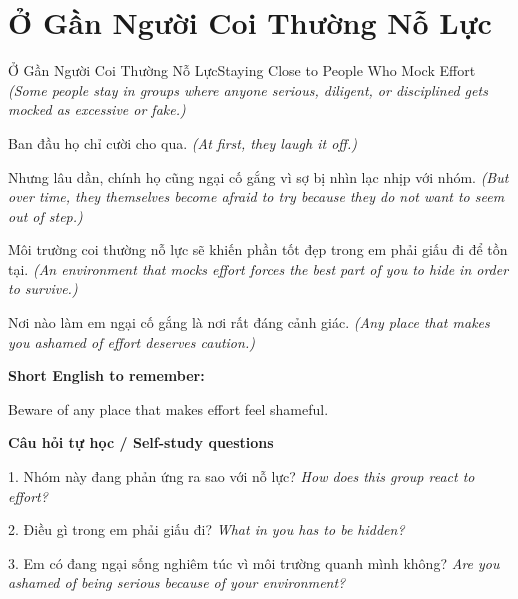 \section{Ở Gần Người Coi Thường Nỗ Lực}
\begin{truyen}{Ở Gần Người Coi Thường Nỗ Lực}{Staying Close to People Who Mock Effort}
\textit{(Some people stay in groups where anyone serious, diligent, or disciplined gets mocked as excessive or fake.)}

Ban đầu họ chỉ cười cho qua.
\textit{(At first, they laugh it off.)}

Nhưng lâu dần, chính họ cũng ngại cố gắng vì sợ bị nhìn lạc nhịp với nhóm.
\textit{(But over time, they themselves become afraid to try because they do not want to seem out of step.)}

Môi trường coi thường nỗ lực sẽ khiến phần tốt đẹp trong em phải giấu đi để tồn tại.
\textit{(An environment that mocks effort forces the best part of you to hide in order to survive.)}

\end{truyen}

\begin{baihoc}
Nơi nào làm em ngại cố gắng là nơi rất đáng cảnh giác.
\textit{(Any place that makes you ashamed of effort deserves caution.)}
\end{baihoc}

\begin{ghinhoanh}
\textbf{Short English to remember:}

Beware of any place that makes effort feel shameful.

\end{ghinhoanh}

\begin{tuhocnhanh}
\textbf{Câu hỏi tự học / Self-study questions}

1. Nhóm này đang phản ứng ra sao với nỗ lực? \textit{How does this group react to effort?}

2. Điều gì trong em phải giấu đi? \textit{What in you has to be hidden?}

3. Em có đang ngại sống nghiêm túc vì môi trường quanh mình không? \textit{Are you ashamed of being serious because of your environment?}
\end{tuhocnhanh}
\ngancach

